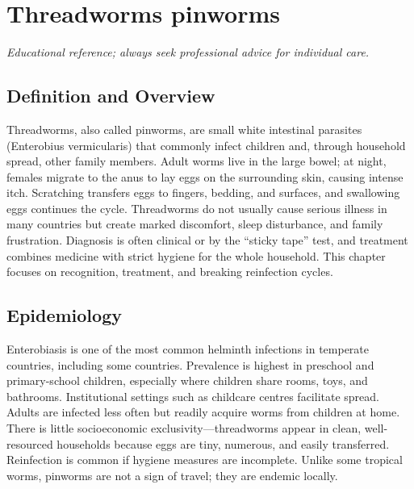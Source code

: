 \chapter{Threadworms pinworms}

\medskip
\noindent\textit{Educational reference; always seek professional advice for individual care.}

\section*{Definition and Overview}
Threadworms, also called pinworms, are small white intestinal parasites (Enterobius vermicularis) that commonly infect children and, through household spread, other family members. Adult worms live in the large bowel; at night, females migrate to the anus to lay eggs on the surrounding skin, causing intense itch. Scratching transfers eggs to fingers, bedding, and surfaces, and swallowing eggs continues the cycle. Threadworms do not usually cause serious illness in many countries but create marked discomfort, sleep disturbance, and family frustration. Diagnosis is often clinical or by the ``sticky tape'' test, and treatment combines medicine with strict hygiene for the whole household. This chapter focuses on recognition, treatment, and breaking reinfection cycles.

\section*{Epidemiology}
Enterobiasis is one of the most common helminth infections in temperate countries, including some countries. Prevalence is highest in preschool and primary-school children, especially where children share rooms, toys, and bathrooms. Institutional settings such as childcare centres facilitate spread. Adults are infected less often but readily acquire worms from children at home. There is little socioeconomic exclusivity---threadworms appear in clean, well-resourced households because eggs are tiny, numerous, and easily transferred. Reinfection is common if hygiene measures are incomplete. Unlike some tropical worms, pinworms are not a sign of travel; they are endemic locally.

